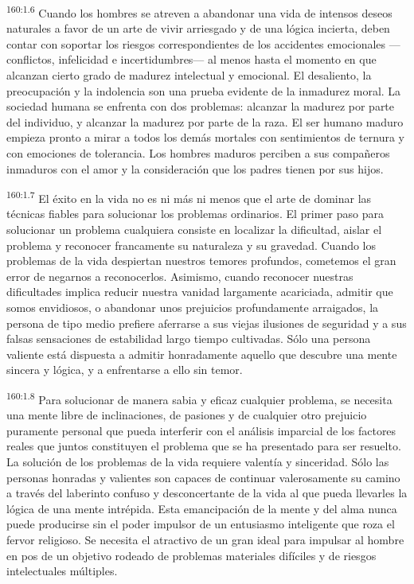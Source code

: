 \par
\textsuperscript{160:1.6} Cuando los hombres se atreven a abandonar una vida de intensos deseos naturales a favor de un arte de vivir arriesgado y de una lógica incierta, deben contar con soportar los riesgos correspondientes de los accidentes emocionales ---conflictos, infelicidad e incertidumbres--- al menos hasta el momento en que alcanzan cierto grado de madurez intelectual y emocional. El desaliento, la preocupación y la indolencia son una prueba evidente de la inmadurez moral. La sociedad humana se enfrenta con dos problemas: alcanzar la madurez por parte del individuo, y alcanzar la madurez por parte de la raza. El ser humano maduro empieza pronto a mirar a todos los demás mortales con sentimientos de ternura y con emociones de tolerancia. Los hombres maduros perciben a sus compañeros inmaduros con el amor y la consideración que los padres tienen por sus hijos.

\par
\textsuperscript{160:1.7} El éxito en la vida no es ni más ni menos que el arte de dominar las técnicas fiables para solucionar los problemas ordinarios. El primer paso para solucionar un problema cualquiera consiste en localizar la dificultad, aislar el problema y reconocer francamente su naturaleza y su gravedad. Cuando los problemas de la vida despiertan nuestros temores profundos, cometemos el gran error de negarnos a reconocerlos. Asimismo, cuando reconocer nuestras dificultades implica reducir nuestra vanidad largamente acariciada, admitir que somos envidiosos, o abandonar unos prejuicios profundamente arraigados, la persona de tipo medio prefiere aferrarse a sus viejas ilusiones de seguridad y a sus falsas sensaciones de estabilidad largo tiempo cultivadas. Sólo una persona valiente está dispuesta a admitir honradamente aquello que descubre una mente sincera y lógica, y a enfrentarse a ello sin temor.

\par
\textsuperscript{160:1.8} Para solucionar de manera sabia y eficaz cualquier problema, se necesita una mente libre de inclinaciones, de pasiones y de cualquier otro prejuicio puramente personal que pueda interferir con el análisis imparcial de los factores reales que juntos constituyen el problema que se ha presentado para ser resuelto. La solución de los problemas de la vida requiere valentía y sinceridad. Sólo las personas honradas y valientes son capaces de continuar valerosamente su camino a través del laberinto confuso y desconcertante de la vida al que pueda llevarles la lógica de una mente intrépida. Esta emancipación de la mente y del alma nunca puede producirse sin el poder impulsor de un entusiasmo inteligente que roza el fervor religioso. Se necesita el atractivo de un gran ideal para impulsar al hombre en pos de un objetivo rodeado de problemas materiales difíciles y de riesgos intelectuales múltiples.


